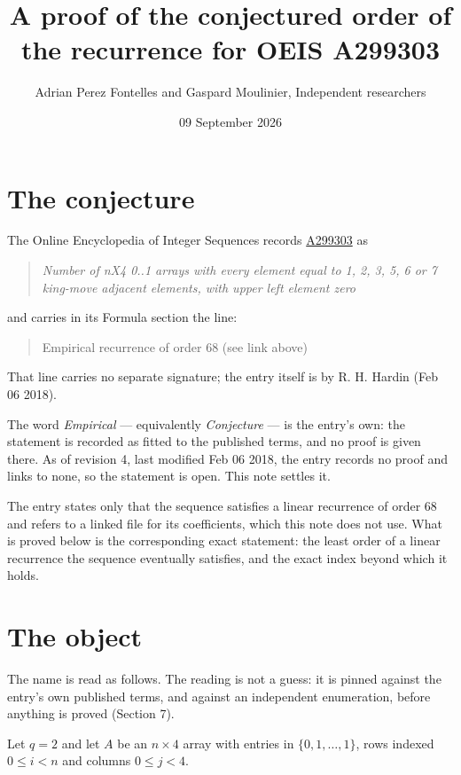 \documentclass[11pt]{article}
\title{A proof of the conjectured order of the recurrence for OEIS A299303}
\author{Adrian Perez Fontelles and Gaspard Moulinier, Independent researchers}
\date{09 September 2026}
\theoremstyle{definition}
\begin{document}
\maketitle
\section{The conjecture}

The Online Encyclopedia of Integer Sequences records \href{https://oeis.org/A299303}{A299303} as

\begin{quote}\itshape Number of nX4 0..1 arrays with every element equal to 1, 2, 3, 5, 6 or 7 king-move adjacent elements, with upper left element zero\end{quote}

and carries in its Formula section the line:

\begin{quote}\ttfamily Empirical recurrence of order 68 (see link above)\end{quote}

That line carries no separate signature; the entry itself is by R. H. Hardin (Feb 06 2018).

The word {\itshape Empirical} --- equivalently {\itshape Conjecture} --- is the entry's own: the statement is recorded as fitted to the published terms, and no proof is given there. As of revision 4, last modified Feb 06 2018, the entry records no proof and links to none, so the statement is open. This note settles it.

The entry states only that the sequence satisfies a linear recurrence of order $68$ and refers to a linked file for its coefficients, which this note does not use. What is proved below is the corresponding exact statement: the least order of a linear recurrence the sequence eventually satisfies, and the exact index beyond which it holds.

\section{The object}

The name is read as follows. The reading is not a guess: it is pinned against the entry's own published terms, and against an independent enumeration, before anything is proved (Section 7).

Let $q = 2$ and let $A$ be an $n \times 4$ array with entries in $\{0,1,\dots,1\}$, rows indexed $0 \le i < n$ and columns $0 \le j < 4$.
\end{document}
